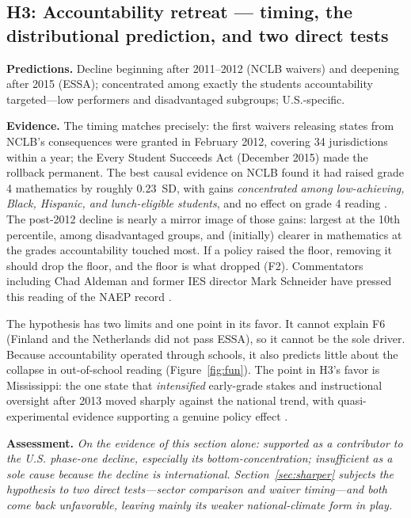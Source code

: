 \documentclass[11pt]{article}
\begin{document}
\subsection{H3: Accountability retreat --- timing, the distributional prediction, and two direct tests}
\label{sec:h3}

\textbf{Predictions.} Decline beginning after 2011--2012 (NCLB waivers) and deepening after 2015 (ESSA); concentrated among exactly the students accountability targeted---low performers and disadvantaged subgroups; U.S.-specific.

\textbf{Evidence.} The timing matches precisely: the first waivers releasing states from NCLB's consequences were granted in February 2012, covering 34 jurisdictions within a year; the Every Student Succeeds Act (December 2015) made the rollback permanent. The best causal evidence on NCLB found it had raised grade 4 mathematics by roughly 0.23~SD, with gains \emph{concentrated among low-achieving, Black, Hispanic, and lunch-eligible students}, and no effect on grade 4 reading \citep{deejacob2011}. The post-2012 decline is nearly a mirror image of those gains: largest at the 10th percentile, among disadvantaged groups, and (initially) clearer in mathematics at the grades accountability touched most. If a policy raised the floor, removing it should drop the floor, and the floor is what dropped (F2). Commentators including Chad Aldeman and former IES director Mark Schneider have pressed this reading of the NAEP record \citep{aldeman2025}.

The hypothesis has two limits and one point in its favor. It cannot explain F6 (Finland and the Netherlands did not pass ESSA), so it cannot be the sole driver. Because accountability operated through schools, it also predicts little about the collapse in out-of-school reading (Figure~\ref{fig:fun}). The point in H3's favor is Mississippi: the one state that \emph{intensified} early-grade stakes and instructional oversight after 2013 moved sharply against the national trend, with quasi-experimental evidence supporting a genuine policy effect \citep{spencer2024}.

\textbf{Assessment.} \emph{On the evidence of this section alone: supported as a contributor to the U.S. phase-one decline, especially its bottom-concentration; insufficient as a sole cause because the decline is international. Section~\ref{sec:sharper} subjects the hypothesis to two direct tests---sector comparison and waiver timing---and both come back unfavorable, leaving mainly its weaker national-climate form in play.}
\end{document}

